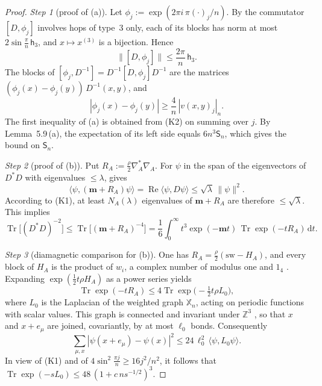 \documentclass[11pt]{amsart}
\theoremstyle{definition}
\begin{document}
\begin{proof}
\emph{Step 1} (proof of (a)).
Let $\phi_j:=\exp(2\pi i\,\pi(\cdot)_j/n)$.
By \cite[Proposition~3.6\,(c)]{QEDII} the commutator $[D,\phi_j]$ involves hops of type~$3$ only, each of its blocks has norm at most $2\sin\frac\pi n\,\mathsf h_3$, and $x\mapsto x^{(3)}$ is a bijection.
Hence
\begin{equation*}
\|[D,\phi_j]\|\le\frac{2\pi}{n}\,\mathsf h_3.
\end{equation*}
The blocks of $[\phi_j,D^{-1}]=D^{-1}[D,\phi_j]D^{-1}$ are the matrices $(\phi_j(x)-\phi_j(y))\,D^{-1}(x,y)$, and
\begin{equation*}
|\phi_j(x)-\phi_j(y)|\ge\frac4n\,|v(x,y)_j|_n.
\end{equation*}
The first inequality of (a) is obtained from (K2) on summing over $j$.
By Lemma~5.9\,(a), the expectation of its left side equals $6n^3\mathsf S_n$, which gives the bound on $\mathsf S_n$.

\emph{Step 2} (proof of (b)).
Put $R_A:=\frac\rho2\nabla_A^*\nabla_A$.
For $\psi$ in the span of the eigenvectors of $D^*D$ with eigenvalues $\le\lambda$, \cite[Proposition~3.18\,(b)]{QEDII} gives
\begin{equation*}
\langle\psi,(\mathbf m+R_A)\psi\rangle=\operatorname{Re}\langle\psi,D\psi\rangle\le\sqrt\lambda\,\|\psi\|^2.
\end{equation*}
According to (K1), at least $N_A(\lambda)$ eigenvalues of $\mathbf m+R_A$ are therefore $\le\sqrt\lambda$.
This implies
\begin{equation*}
\operatorname{Tr}\bigl[(D^*D)^{-2}\bigr]\le\operatorname{Tr}\bigl[(\mathbf m+R_A)^{-4}\bigr]=\frac16\int_0^\infty t^3\exp(-\mathbf mt)\,\operatorname{Tr}\exp(-tR_A)\,\mathrm dt.
\end{equation*}

\emph{Step 3} (diamagnetic comparison for (b)).
One has $R_A=\frac\rho2(\mathrm{sw}-H_A)$, and every block of $H_A$ is the product of $w_i$, a complex number of modulus one and $1_4$ \cite[Proposition~3.18\,(a), (b)]{QEDII}.
Expanding $\exp(\frac12t\rho H_A)$ as a power series yields
\begin{equation*}
\operatorname{Tr}\exp(-tR_A)\le4\operatorname{Tr}\exp\bigl(-\tfrac12t\rho L_0\bigr),
\end{equation*}
where $L_0$ is the Laplacian of the weighted graph $\mathbb X_n$, acting on periodic functions with scalar values.
This graph is connected and invariant under $\mathbb Z^3$ \cite[Proposition~3.6\,(d)]{QEDII}, so that $x$ and $x+e_\mu$ are joined, covariantly, by at most $\ell_0$ bonds.
Consequently
\begin{equation*}
\sum_{\mu,x}|\psi(x+e_\mu)-\psi(x)|^2\le24\,\ell_0^2\,\langle\psi,L_0\psi\rangle.
\end{equation*}
In view of (K1) and of $4\sin^2\frac{\pi j}{n}\ge16j^2/n^2$, it follows that $\operatorname{Tr}\exp(-sL_0)\le48\,(1+c\,ns^{-1/2})^3$.


\end{proof}
\end{document}
